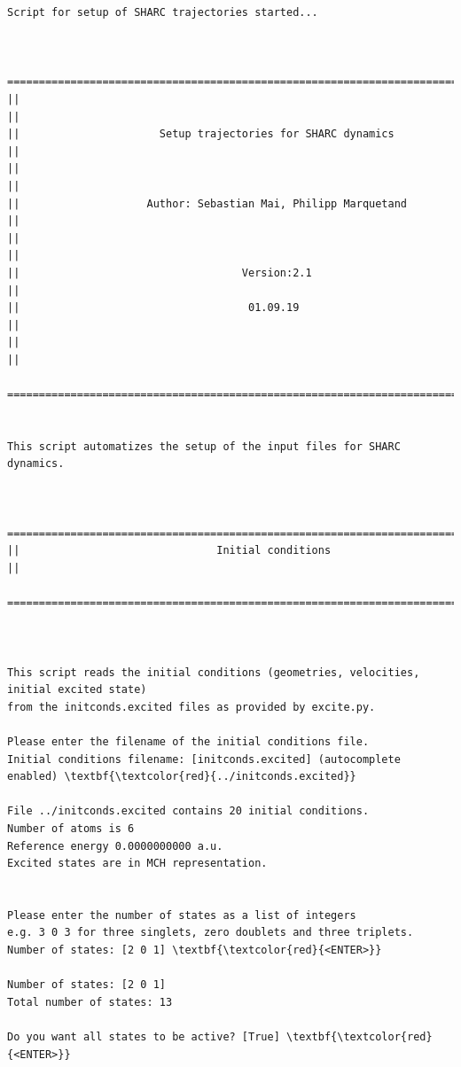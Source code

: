 \documentclass[a4paper,11pt,DIV=15,openany]{scrbook}
\begin{document}
\begin{oframed}
\footnotesize\begin{Verbatim}[commandchars=\\\{\}]
Script for setup of SHARC trajectories started...


  ================================================================================
||                                                                                ||
||                      Setup trajectories for SHARC dynamics                     ||
||                                                                                ||
||                    Author: Sebastian Mai, Philipp Marquetand                   ||
||                                                                                ||
||                                   Version:2.1                                  ||
||                                    01.09.19                                    ||
||                                                                                ||
  ================================================================================


This script automatizes the setup of the input files for SHARC dynamics.
  

  ================================================================================
||                               Initial conditions                               ||
  ================================================================================



This script reads the initial conditions (geometries, velocities, initial excited state)
from the initconds.excited files as provided by excite.py.

Please enter the filename of the initial conditions file.
Initial conditions filename: [initconds.excited] (autocomplete enabled) \textbf{\textcolor{red}{../initconds.excited}}

File ../initconds.excited contains 20 initial conditions.
Number of atoms is 6
Reference energy 0.0000000000 a.u.
Excited states are in MCH representation.


Please enter the number of states as a list of integers
e.g. 3 0 3 for three singlets, zero doublets and three triplets.
Number of states: [2 0 1] \textbf{\textcolor{red}{<ENTER>}}

Number of states: [2 0 1]
Total number of states: 13

Do you want all states to be active? [True] \textbf{\textcolor{red}{<ENTER>}}


\end{Verbatim}
\end{oframed}
\end{document}
